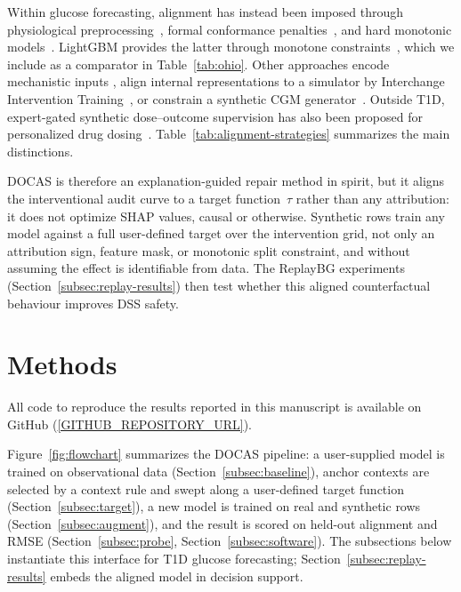 \documentclass[a4paper,fleqn]{cas-sc}
\begin{document}
Within glucose forecasting, alignment has instead been imposed through
physiological preprocessing~\citep{prendin2023,zecchin2012,mirshekarian2017},
formal conformance penalties~\citep{kushner2020,kushner2020dt}, and hard
monotonic models~\citep{you2019,runje2023}. LightGBM provides the latter through
monotone constraints~\citep{ke2017}, which we include as a comparator
in Table~\ref{tab:ohio}. Other approaches encode mechanistic inputs
\citep{wolber2025multimodal}, align internal representations to a simulator by
Interchange Intervention Training~\citep{esponera2025}, or constrain a synthetic
CGM generator~\citep{prendin2025mongan}. Outside T1D, expert-gated synthetic
dose--outcome supervision has also been proposed for personalized drug
dosing~\citep{verma2025genex}. Table~\ref{tab:alignment-strategies} summarizes
the main distinctions.

\FloatBarrier


DOCAS is therefore an explanation-guided repair method in spirit, but it aligns
the interventional audit curve to a target function~$\tau$ rather than any
attribution: it does not optimize SHAP values, causal or otherwise. Synthetic
rows train any model against a full user-defined target over the intervention
grid, not only an attribution sign, feature mask, or monotonic split
constraint, and without assuming the effect is identifiable from data. The ReplayBG experiments
(Section~\ref{subsec:replay-results}) then test whether this aligned
counterfactual behaviour improves DSS safety.

\section{Methods}\label{sec:methods}

All code to reproduce the results reported in this manuscript is available on
GitHub (\url{[GITHUB_REPOSITORY_URL]}).

Figure~\ref{fig:flowchart} summarizes the DOCAS pipeline: a user-supplied
model is trained on observational data (Section~\ref{subsec:baseline}),
anchor contexts are selected by a context rule and swept along a user-defined
target function (Section~\ref{subsec:target}), a new model is trained on real
and synthetic rows (Section~\ref{subsec:augment}), and the result is scored on
held-out alignment and RMSE (Section~\ref{subsec:probe},
Section~\ref{subsec:software}). The subsections below instantiate this
interface for T1D glucose forecasting; Section~\ref{subsec:replay-results}
embeds the aligned model in decision support.
\end{document}
